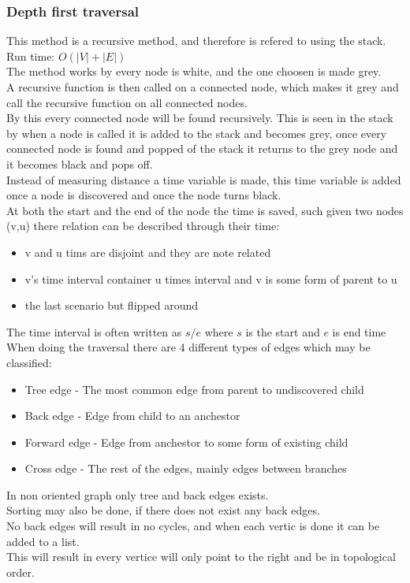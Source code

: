 \documentclass[12pt, a4paper]{article}
\begin{document}
			\subsubsection{Depth first traversal}
				This method is a recursive method, and therefore is refered to using the stack.\\
				Run time: $O(|V|+|E|)$\\
				The method works by every node is white, and the one choosen is made grey.\\
				A recursive function is then called on a connected node, which makes it grey and call the recursive function on all connected nodes.\\
				By this every connected node will be found recursively. This is seen in the stack by when a node is called it is added to the stack and becomes grey, once every connected node is found and popped of the stack it returns to the grey node and it becomes black and pops off.\\
				Instead of measuring distance a time variable is made, this time variable is added once a node is discovered and once the node turns black.\\
				At both the start and the end of the node the time is saved, such given two nodes (v,u) there relation can be described through their time:
				\begin{itemize}
					\item v and u tims are disjoint and they are note related
					\item v's time interval container u times interval and v is some form of parent to u
					\item the last scenario but flipped around
				\end{itemize}
				The time interval is often written as $s/e$ where $s$ is the start and $e$ is end time\\
				When doing the traversal there are 4 different types of edges which may be classified:
				\begin{itemize}
					\item Tree edge - The most common edge from parent to undiscovered child
					\item Back edge - Edge from child to an anchestor  
					\item Forward edge - Edge from anchestor to some form of existing child
					\item Cross edge - The rest of the edges, mainly edges between branches
				\end{itemize}
				In non oriented graph only tree and back edges exists.\\[4mm]
				Sorting may also be done, if there does not exist any back edges.\\
				No back edges will result in no cycles, and when each vertic is done it can be added to a list.\\
				This will result in every vertice will only point to the right and be in topological order.
\end{document}

